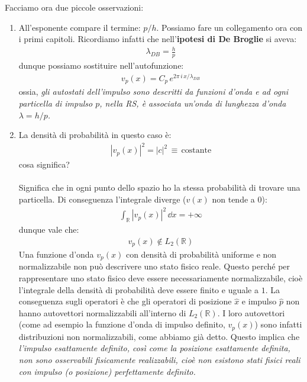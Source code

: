 \begin{myapprf}
	Facciamo ora due piccole osservazioni:
	
\begin{enumerate}[label=\arabic*)]
	\item All'esponente compare il termine: $p/h$. Possiamo fare un collegamento ora con i primi capitoli. Ricordiamo infatti che nell'\textbf{ipotesi di De Broglie} si aveva: 
	\begin{align*}
		\lambda_{DB} = \frac{h}{p}
	\end{align*}
		dunque possiamo sostituire nell'autofunzione:
	\begin{align*}
		v_p(x) = C_p \, e^{2\pi \, i \, x / \lambda_{DB}}
	\end{align*}
		ossia, \textit{gli autostati dell'impulso sono descritti da funzioni d'onda e ad ogni particella di impulso $p$, nella RS, è associata un'onda di lunghezza d'onda $\lambda = h/p$.}
	
	\item La densità di probabilità in questo caso è:
	\begin{align*}
		|v_p(x)|^2 = |c|^2 \, \equiv \, \text{costante}
	\end{align*}
		cosa significa?
		\\
		\\
		Significa che in ogni punto dello spazio ho la stessa probabilità di trovare una particella. Di conseguenza l'integrale diverge ($v(x)$ non tende a $0$):
	\begin{align*}
		\int_{\mathbb{R}} |v_p(x)|^2 \, \dd x = + \infty	
	\end{align*}
		dunque vale che:
	\begin{align*}
		v_p(x) \notin L_2(\mathbb{R})
	\end{align*}
		Una funzione d'onda $v_p(x)$ con densità di probabilità uniforme e non normalizzabile non può descrivere uno stato fisico reale. Questo perché per rappresentare uno stato fisico deve essere necessariamente normalizzabile, cioè l'integrale della densità di probabilità deve essere finito e uguale a $1$. La conseguenza sugli operatori è che gli operatori di posizione $\hat{x}$ e impulso $\hat{p}$ non hanno autovettori normalizzabili all'interno di $L_2(\mathbb{R})$. I loro autovettori (come ad esempio la funzione d'onda di impulso definito, $v_p(x)$) sono infatti distribuzioni non normalizzabili, come abbiamo già detto. Questo implica che \textit{l'impulso esattamente definito, così come la posizione esattamente definita, non sono osservabili fisicamente realizzabili, cioè non esistono stati fisici reali con impulso (o posizione) perfettamente definito.}
\end{enumerate}
\end{myapprf}

